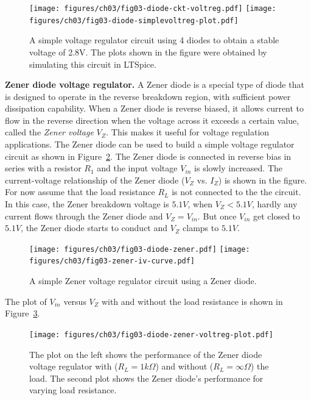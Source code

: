 \begin{figure}[htbp]
    \centering
    \texttt{[image: figures/ch03/fig03-diode-ckt-voltreg.pdf]}
    \hspace{1em} %
    \texttt{[image: figures/ch03/fig03-diode-simplevoltreg-plot.pdf]}
    \caption{A simple voltage regulator circuit using 4 diodes to obtain a stable voltage of 2.8V. The plots shown in the figure were obtained by simulating this circuit in LTSpice.}
    \label{fig:03-diode-voltreg1}
\end{figure}

\noindent\textbf{Zener diode voltage regulator.} A Zener diode is a special type of diode that is designed to operate in the reverse breakdown region, with sufficient power dissipation capability. When a Zener diode is reverse biased, it allows current to flow in the reverse direction when the voltage across it exceeds a certain value, called the \textit{Zener voltage} $V_Z$. This makes it useful for voltage regulation applications. The Zener diode can be used to build a simple voltage regulator circuit as shown in Figure~\ref{fig:03-diode-voltreg2}. The Zener diode is connected in reverse bias in series with a resistor $R_1$ and the input voltage $V_{in}$ is slowly increased.  The current-voltage relationship of the Zener diode ($V_Z$ vs. $I_Z$) is shown in the figure. For now assume that the load resistance $R_L$ is not connected to the the circuit. In this case, the Zener breakdown voltage is $5.1V$, when $V_Z < 5.1V$, hardly any current flows through the Zener diode and $V_Z = V_{in}$. But once $V_{in}$ get closed to $5.1V$, the Zener diode starts to conduct and $V_Z$ clamps to $5.1V$.

\begin{figure}[htbp]
    \centering
    \texttt{[image: figures/ch03/fig03-diode-zener.pdf]}
    \hspace{1em} %
    \texttt{[image: figures/ch03/fig03-zener-iv-curve.pdf]}
    \caption{A simple Zener voltage regulator circuit using a Zener diode.}
    \label{fig:03-diode-voltreg2}
\end{figure}

The plot of $V_{in}$ versus $V_Z$ with and without the load resistance is shown in Figure~\ref{fig:03-diode-zener-voltreg-plot}.

\begin{figure}[htbp]
    \centering
    \texttt{[image: figures/ch03/fig03-diode-zener-voltreg-plot.pdf]}
    \caption{The plot on the left shows the performance of the Zener diode voltage regulator with ($R_L = 1k\Omega$) and without ($R_L = \infty \Omega$) the load. The second plot shows the Zener diode's performance for varying load resistance.}
    \label{fig:03-diode-zener-voltreg-plot}
\end{figure}

